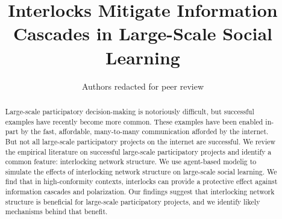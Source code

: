 \documentclass[manuscript,screen,review,acmsmall]{acmart}
\begin{document}
\title{Interlocks Mitigate Information Cascades in Large-Scale Social Learning}

\author{Authors redacted for peer review}





\begin{abstract}
Large-scale participatory decision-making is notoriously difficult, but successful examples have recently become more common. These examples have been enabled in-part by the fast, affordable, many-to-many communication afforded by the internet. But not all large-scale participatory projects on the internet are successful. We review the empirical literature on successful large-scale participatory projects and identify a common feature: interlocking network structure. We use agent-based modelig to simulate the effects of interlocking network structure on large-scale social learning. We find that in high-conformity contexts, interlocks can provide a protective effect against information cascades and polarization. Our findings suggest that interlocking network structure is beneficial for large-scale participatory projects, and we identify likely mechanisms behind that benefit.
\end{abstract}
\end{document}
